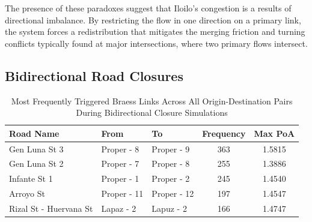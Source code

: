 The presence of these paradoxes suggest that Iloilo's congestion is a results of directional imbalance. By restricting the flow in one direction on a primary link, the system forces a redistribution that mitigates the merging friction and turning conflicts typically found at major intersections, where two primary flows intersect.

\subsection{Bidirectional Road Closures}
\label{sec:bidirectional_closures}


\begin{table}[H]
    \centering
    \renewcommand{\thetable}{4.1b}

    \begin{tabular}{|l|l|l|c|c|}
    \hline
    \textbf{Road Name} & \textbf{From} & \textbf{To} & \textbf{Frequency} & \textbf{Max PoA} \\ \hline
    Gen Luna St 3 & Proper - 8 & Proper - 9 & 363 & 1.5815 \\ \hline
    Gen Luna St 2 & Proper - 7 & Proper - 8 & 255 & 1.3886 \\ \hline
    Infante St 1 & Proper - 1 & Proper - 2 & 245 & 1.4540 \\ \hline
    Arroyo St & Proper - 11 & Proper - 12 & 197 & 1.4547 \\ \hline
    Rizal St - Huervana St & Lapaz - 2 & Lapuz - 2 & 166 & 1.4747 \\ \hline
    \end{tabular}
    \caption{Most Frequently Triggered Braess Links Across All Origin-Destination Pairs During Bidirectional Closure Simulations}
    \label{tab:5.1b}
\end{table}

